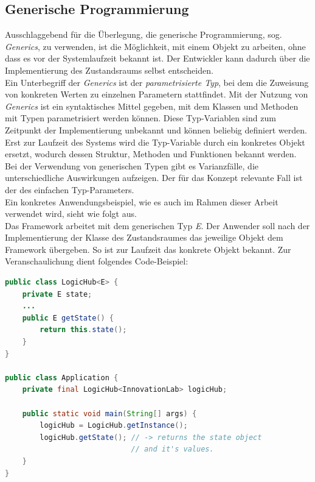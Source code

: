 \subsection{Generische Programmierung} %
\label{subsec:java_generics}
    Ausschlaggebend für die Überlegung, die generische Programmierung, sog. \textit{Generics}, zu verwenden, ist die Möglichkeit, mit einem Objekt 
    zu arbeiten, ohne dass es vor der Systemlaufzeit bekannt ist. Der Entwickler kann dadurch über die Implementierung des Zustandsraums selbst entscheiden. 
    \\
    \linebreak
    Ein Unterbegriff der \textit{Generics} ist der \textit{parametrisierte Typ}, bei dem die Zuweisung von konkreten Werten zu einzelnen Parametern 
    stattfindet. Mit der Nutzung von \textit{Generics} ist ein syntaktisches Mittel 
    gegeben, mit dem Klassen und Methoden mit Typen parametrisiert werden können. Diese Typ-Variablen sind zum 
    Zeitpunkt der Implementierung unbekannt und können beliebig definiert werden. Erst zur Laufzeit des Systems 
    wird die Typ-Variable durch ein konkretes Objekt ersetzt, wodurch dessen Struktur, Methoden und Funktionen bekannt 
    werden. Bei der Verwendung von generischen Typen gibt es 
    Varianzfälle, die unterschiedliche Auswirkungen aufzeigen. Der für das Konzept relevante Fall ist der des 
    einfachen Typ-Parameters. 
    \\ 
    \linebreak
    Ein konkretes Anwendungsbeispiel, wie es 
    auch im Rahmen dieser Arbeit verwendet wird, sieht wie folgt aus. 
    \\
    Das Framework arbeitet mit dem generischen Typ \textit{E}. Der Anwender soll nach der Implementierung der Klasse des Zustandsraumes das 
    jeweilige Objekt dem Framework übergeben. So ist zur Laufzeit das konkrete Objekt bekannt. Zur Veranschaulichung dient folgendes Code-Beispiel:
\begin{lstlisting}[language=Java, frame=lines, xleftmargin=\parindent, style=algoBericht, label={code:generics}, captionpos=b, caption={Zustandsobjekt als Typ-Variable}]
public class LogicHub<E> {
    private E state;
    ...
    public E getState() {
        return this.state();
    }
}

public class Application {
    private final LogicHub<InnovationLab> logicHub;

    public static void main(String[] args) {
        logicHub = LogicHub.getInstance();
        logicHub.getState(); // -> returns the state object 
                             // and it's values.
    }
}
\end{lstlisting}
